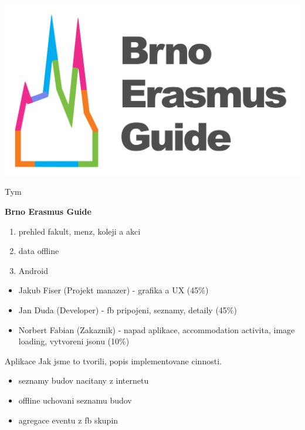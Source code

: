 \documentclass[pdf]{beamer}
\begin{document}
\begin{frame}
  \begin{center}
    \includegraphics[scale=0.13]{app_menu_header}
  \end{center}
\end{frame}

\begin{frame}{Tym}
  \begin{minipage}{\textwidth}
    \textbf{Brno Erasmus Guide}
    \begin{enumerate}
      \item prehled fakult, menz, koleji a akci
      \item data offline
      \item Android
    \end{enumerate}
    \vspace{2\baselineskip}
  \end{minipage}
  \begin{minipage}{\textwidth}
    \begin{itemize}
      \item Jakub Fiser (Projekt manazer) - grafika a UX (45\%)
      \item Jan Duda (Developer) - fb pripojeni, seznamy, detaily (45\%)
      \item Norbert Fabian (Zakaznik) - napad aplikace,
      accommodation activita, image loading, vytvoreni jsonu (10\%)
    \end{itemize}  
  \end{minipage}
\end{frame}

\begin{frame}{Aplikace}
  Jak jsme to tvorili, popis implementovane cinnosti.
 \begin{itemize}
   \item seznamy budov nacitany z internetu
   \item offline uchovani seznamu budov
   \item agregace eventu z fb skupin
 \end{itemize}  
\end{frame}
\end{document}
